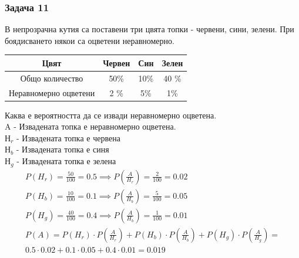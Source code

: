 \documentclass[fleqn, 12pt]{article}
\theoremstyle{definition}
\begin{document}
\subsubsection*{Задача 11}
В непрозрачна кутия са поставени три цвята топки - червени, сини, зелени. При боядисването някои са оцветени неравномерно. 
\begin{center}
\begin{tabular}{|c|c|c|c|} 
\hline
Цвят & Червен & Син & Зелен \\
\hline
Общо количество  & 50\% & 10\% & 40 \% \\
\hline
Неравномерно оцветени & 2 \% & 5\% & 1\% \\
\hline
\end{tabular}
\end{center}
Каква е вероятността да се извади неравномерно оцветена. \\
A - Извадената топка е неравномерно оцветена. \\
$Н_{r}$ - Извадената топка е червена \\
$Н_{b}$ - Извадената топка е синя \\
$Н_{g}$ - Извадената топка е зелена 
\begin{gather*}
P(H_{r}) = \frac{50}{100} = 0.5 \implies P \left( \frac{A}{H_{r}} \right) = \frac{2}{100} = 0.02 \\
P(H_{b}) = \frac{10}{100} = 0.1 \implies P \left( \frac{A}{H_{b}} \right) = \frac{5}{100} = 0.05 \\
P(H_{g}) = \frac{40}{100} = 0.4 \implies P \left( \frac{A}{H_{b}} \right) = \frac{1}{100} = 0.01 \\
P(A) = P(H_{r}) \cdot P\left( \frac{A}{H_{r}}\right) +
P(H_{b})\cdot P\left( \frac{A}{H_{b}} \right)+
P(H_{g})\cdot P\left( \frac{A}{H_{g}} \right) = \\
0.5 \cdot 0.02 + 0.1 \cdot 0.05 + 0.4 \cdot 0.01 = 0.019 
\end{gather*}
\end{document}

